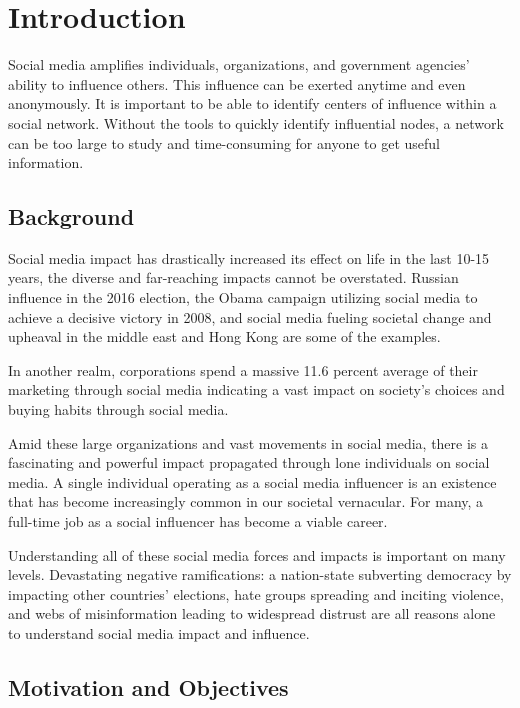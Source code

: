 \documentclass[11pt,twocolumn]{article}
\begin{document}
\section{Introduction}

Social media amplifies individuals, organizations, and government agencies' ability to influence others.  This influence can be exerted anytime and even anonymously. It is important to be able to identify centers of influence within a social network. Without the tools to quickly identify influential nodes, a network can be too large to study and time-consuming for anyone to get useful information.    

\subsection{Background}

Social media impact has drastically increased its effect on life in the last 10-15 years, the diverse and far-reaching impacts cannot be overstated. Russian influence in the 2016 election, the Obama campaign utilizing social media to achieve a decisive victory in 2008, and social media fueling societal change and upheaval in the middle east and Hong Kong are some of the examples. 

In another realm, corporations spend a massive 11.6 percent \cite{social-media-pricing} average of their marketing through social media indicating a vast impact on society's choices and buying habits through social media.  

Amid these large organizations and vast movements in social media, there is a fascinating and powerful impact propagated through lone individuals on social media.  A single individual operating as a social media influencer is an existence that has become increasingly common in our societal vernacular. For many, a full-time job as a social influencer has become a viable career. 

Understanding all of these social media forces and impacts is important on many levels. Devastating negative ramifications: a nation-state subverting democracy by impacting other countries’ elections, hate groups spreading and inciting violence, and webs of misinformation leading to widespread distrust are all reasons alone to understand social media impact and influence. 

\subsection{Motivation and Objectives}
\end{document}
